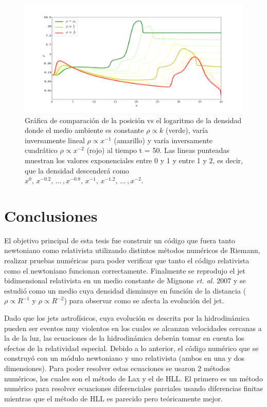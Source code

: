 \documentclass[12pt,a4paper]{book}
\begin{document}
\begin{figure}
  \centering
    \includegraphics[width=1\textwidth]{./Figuras/jet/perfiles/densidades_comparacion.png}
  \caption{Gráfica de comparación de la posición vs el logaritmo de la densidad 
  donde el medio ambiente es constante $\rho \varpropto k$ (verde), varía inversamente lineal
  $\rho \varpropto x^{-1}$ (amarillo) y varía inversamente cuadrático $\rho \varpropto x^{-2}$ (rojo)
  al tiempo t = 50.  Las lineas punteadas muestran los valores exponenciales entre 0 y 1 y entre 1 y 2,
  es decir, que la densidad descenderá como $x^0, \, x^{-0.2}, \, . . . \,  ,x^{-0.8} , \, x^{-1}  , \, x^{-1.2}
  , \, . . . \,  , x^{-2}$.}\label{fig:perfiles_comparacion_jet}
\end{figure}




\chapter{Conclusiones}

El objetivo principal de esta tesis fue construir un código que fuera tanto newtoniano como relativista utilizando distintos métodos numéricos de Riemann, realizar pruebas numéricas para poder verificar que tanto el código relativista como el newtoniano funcionan correctamente. Finalmente se reprodujo el jet bidimensional relativista en un medio constante de Mignone \emph{et. al.} 2007 y se estudió 
como un medio cuya densidad disminuye en función de la distancia ($\rho \propto R^{-1}$ y $\rho \propto R^{-2}$) para observar como se afecta la evolución del jet.

Dado que los jets astrofísicos, cuya evolución es descrita por la hidrodinámica pueden ser eventos muy violentos en los cuales se alcanzan velocidades cercanas a la de la luz, 
las ecuaciones de la hidrodinámica 
deberán tomar en cuenta los efectos de la relatividad especial. Debido a lo anterior, el código numérico que se construyó con un módulo newtoniano y uno relativista 
(ambos en una y dos dimensiones).
{\color{blue} Para poder resolver estas ecuaciones se usaron 2 métodos numéricos, los cuales son el método de Lax y el de HLL. El primero es un método numérico para resolver ecuaciones diferenciales parciales
usando diferencias finitas mientras que el método de HLL es parecido pero teóricamente mejor.}
\end{document}

